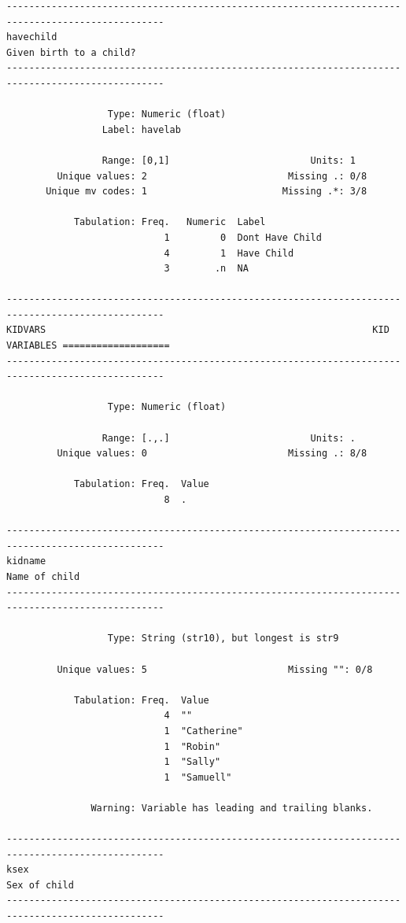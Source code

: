 \documentclass[
]{book}
\begin{document}
\begin{verbatim}
--------------------------------------------------------------------------------------------------
havechild                                                                  Given birth to a child?
--------------------------------------------------------------------------------------------------

                  Type: Numeric (float)
                 Label: havelab

                 Range: [0,1]                         Units: 1
         Unique values: 2                         Missing .: 0/8
       Unique mv codes: 1                        Missing .*: 3/8

            Tabulation: Freq.   Numeric  Label
                            1         0  Dont Have Child
                            4         1  Have Child
                            3        .n  NA

--------------------------------------------------------------------------------------------------
KIDVARS                                                          KID VARIABLES ===================
--------------------------------------------------------------------------------------------------

                  Type: Numeric (float)

                 Range: [.,.]                         Units: .
         Unique values: 0                         Missing .: 8/8

            Tabulation: Freq.  Value
                            8  .

--------------------------------------------------------------------------------------------------
kidname                                                                              Name of child
--------------------------------------------------------------------------------------------------

                  Type: String (str10), but longest is str9

         Unique values: 5                         Missing "": 0/8

            Tabulation: Freq.  Value
                            4  ""
                            1  "Catherine"
                            1  "Robin"
                            1  "Sally"
                            1  "Samuell"

               Warning: Variable has leading and trailing blanks.

--------------------------------------------------------------------------------------------------
ksex                                                                                  Sex of child
--------------------------------------------------------------------------------------------------


\end{verbatim}
\end{document}
